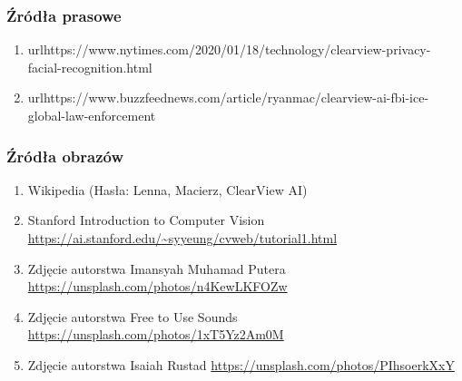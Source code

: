 \documentclass{beamer}
\begin{document}
            \begin{frame}
                \frametitle{Źródła prasowe}
                \begin{enumerate}
                    \item
                        url{https://www.nytimes.com/2020/01/18/technology/clearview-privacy-facial-recognition.html}
                    \item 
                        url{https://www.buzzfeednews.com/article/ryanmac/clearview-ai-fbi-ice-global-law-enforcement}
                \end{enumerate}
            \end{frame}

            \begin{frame}
                \frametitle{Źródła obrazów}
                \begin{enumerate}
                    \item Wikipedia (Hasła: Lenna, Macierz, ClearView AI)
                    \item Stanford Introduction to Computer Vision
                        \url{https://ai.stanford.edu/~syyeung/cvweb/tutorial1.html}
                    \item Zdjęcie autorstwa Imansyah Muhamad Putera
                        \url{https://unsplash.com/photos/n4KewLKFOZw}
                    \item Zdjęcie autorstwa Free to Use Sounds
                        \url{https://unsplash.com/photos/1xT5Yz2Am0M}
                    \item Zdjęcie autorstwa Isaiah Rustad
                        \url{https://unsplash.com/photos/PIhsoerkXxY}
                \end{enumerate}
            \end{frame}
\end{document}
